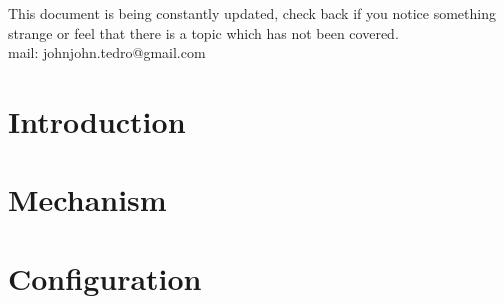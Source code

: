 \documentclass[a4paper]{article}
\begin{document}
This document is being constantly updated, check back if you notice something strange or feel that there is a topic which has not been covered.\\
mail: johnjohn.tedro@gmail.com
\tableofcontents

\section{Introduction}


\section{Mechanism}


\section{Configuration}

\end{document}
